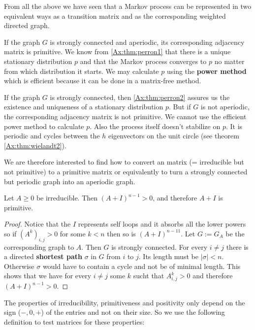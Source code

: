 From all the above we have seen that a Markov process can be represented in two
equivalent ways \textemdash as a transition matrix  and as the 
corresponding weighted directed graph.

If the graph $G$ is strongly connected and aperiodic, its corresponding
adjacency matrix is primitive. We know from \ref{Ax:thm:perron1} that there is a
unique stationary distribution $p$ and that the Markov process converges to $p$ no
matter from which distribution it starts. We may calculate $p$ using the
\textbf{power
method} which is efficient because it can be done in a matrix-free method. 

If the graph $G$ is strongly connected, then \ref{Ax:thm:perron2} assures us the
existence and uniqueness of a stationary distribution $p$. But if $G$ is not
aperiodic, the corresponding adjacency matrix is not primitive. We cannot use
the efficient power method to calculate $p$. Also the process itself doesn't
stabilize on $p$. It is periodic and cycles between the $h$ eigenvectors on
the unit circle (see theorem \ref{Ax:thm:wielandt2}). 

We are therefore interested to find how to convert an 
matrix (= irreducible but not primitive)
to a primitive matrix or equivalently to turn a strongly connected but periodic graph
into an aperiodic graph.

\begin{lemma}\cite{meyer2000matrix}
\label{Ax:lem:1plusA}
Let $A \geq 0$ be irreducible. Then $(A + I)^{n-1} \gt 0$, and therefore $A+I$
is primitive.
\begin{proof}
Notice that the $I$ represents self loops and it absorbs all the lower powers so
if $(A^k)_{i,j} \gt 0$ for some $k \lt n$ then so is $(A+I)^{n-11}$.
Let $G := G_A$ be the corresponding graph to $A$. Then $G$ is strongly
connected. For every $i \neq j$ there is a directed \textbf{shortest path}
$\sigma$ in $G$ from $i$ to $j$. Its length must be $|\sigma| \lt n$. Otherwise
$\sigma$ would have to contain a cycle and not be of minimal length.
This shows that we have for every $i \neq j$ some $k$ sucht that $A^k_{i,j} \gt
0$ and therefore $(A+I)^{n-1} \gt 0$.
\end{proof}
\end{lemma}

The properties of irreducibility, primitiveness and positivity only depend on the
sign ($-,0,+$) of the entries and not on their size. So we use the following definition to
test matrices for these properties:

